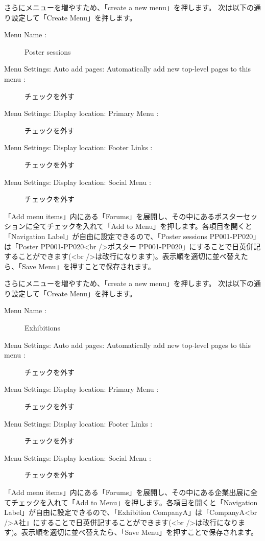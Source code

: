 \documentclass[titlepage,10pt,a4paper,uplatex]{jsbook}
\begin{document}
さらにメニューを増やすため、「create a new menu」を押します。
次は以下の通り設定して「Create Menu」を押します。

\begin{description}
\item[Menu Name : ] Poster sessions
\item[Menu Settings: Auto add pages: Automatically add new top-level pages to this menu : ] チェックを外す
\item[Menu Settings: Display location: Primary Menu : ] チェックを外す
\item[Menu Settings: Display location: Footer Links : ] チェックを外す
\item[Menu Settings: Display location: Social Menu : ] チェックを外す
\end{description}

「Add menu items」内にある「Forums」を展開し、その中にあるポスターセッションに全てチェックを入れて「Add to Menu」を押します。各項目を開くと「Navigation Label」が自由に設定できるので、「Poster sessions PP001-PP020」は「Poster PP001-PP020{\textless}br /{\textgreater}ポスター PP001-PP020」にすることで日英併記することができます({\textless}br /{\textgreater}は改行になります)。表示順を適切に並べ替えたら、「Save Menu」を押すことで保存されます。

さらにメニューを増やすため、「create a new menu」を押します。
次は以下の通り設定して「Create Menu」を押します。

\begin{description}
\item[Menu Name : ] Exhibitions
\item[Menu Settings: Auto add pages: Automatically add new top-level pages to this menu : ] チェックを外す
\item[Menu Settings: Display location: Primary Menu : ] チェックを外す
\item[Menu Settings: Display location: Footer Links : ] チェックを外す
\item[Menu Settings: Display location: Social Menu : ] チェックを外す
\end{description}

「Add menu items」内にある「Forums」を展開し、その中にある企業出展に全てチェックを入れて「Add to Menu」を押します。各項目を開くと「Navigation Label」が自由に設定できるので、「Exhibition CompanyA」は「CompanyA{\textless}br /{\textgreater}A社」にすることで日英併記することができます({\textless}br /{\textgreater}は改行になります)。表示順を適切に並べ替えたら、「Save Menu」を押すことで保存されます。
\end{document}

